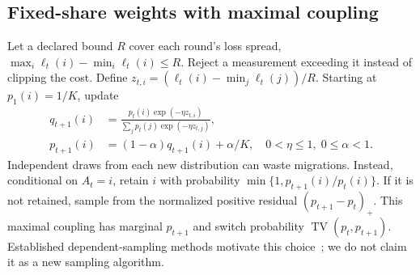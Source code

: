 \documentclass[11pt]{article}
\theoremstyle{definition}\newtheorem{definition}[theorem]{Definition}
\begin{document}
\subsection{Fixed-share weights with maximal coupling}
Let a declared bound $R$ cover each round's loss spread, $\max_i\ell_t(i)-\min_i\ell_t(i)\le R$. Reject a measurement exceeding it instead of clipping the cost. Define $z_{t,i}=(\ell_t(i)-\min_j\ell_t(j))/R$. Starting at $p_1(i)=1/K$, update
\begin{align}
 q_{t+1}(i)&=\frac{p_t(i)\exp(-\eta z_{t,i})}{\sum_jp_t(j)\exp(-\eta z_{t,j})},\\
 p_{t+1}(i)&=(1-\alpha)q_{t+1}(i)+\alpha/K,\quad 0<\eta\le1,\;0\le\alpha<1.\label{eq:share}
\end{align}
Independent draws from each new distribution can waste migrations. Instead, conditional on $A_t=i$, retain $i$ with probability $\min\{1,p_{t+1}(i)/p_t(i)\}$. If it is not retained, sample from the normalized positive residual $(p_{t+1}-p_t)_+$. This maximal coupling has marginal $p_{t+1}$ and switch probability $\operatorname{TV}(p_t,p_{t+1})$. Established dependent-sampling methods motivate this choice~\cite{geulen}; we do not claim it as a new sampling algorithm.
\end{document}
